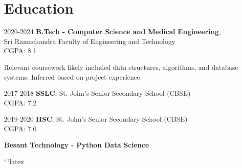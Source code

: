 \section{Education}
\begin{twocolentry}{2020-2024}
        \textbf{B.Tech - Computer Science and Medical Engineering}, \\
        Sri Ramachandra Faculty of Engineering and Technology\\
        CGPA: 8.1
\end{twocolentry}
\vspace{0.10 cm}
\begin{onecolentry}
        \begin{highlights}
            \item Relevant coursework likely included data structures,
                  algorithms, and database systems.  Inferred based on
                  project experience.
        \end{highlights}
\end{onecolentry}
\vspace{0.10 cm}
\begin{twocolentry}{2017-2018}
        \textbf{SSLC}, St. John’s Senior Secondary School (CBSE)\\
        CGPA: 7.2
\end{twocolentry}
\vspace{0.10 cm}
\begin{twocolentry}{2019-2020}
        \textbf{HSC}, St. John’s Senior Secondary School (CBSE)\\
        CGPA: 7.6
\end{twocolentry}
\vspace{0.10 cm}
\begin{onecolentry}
        \textbf{Besant Technology - Python Data Science}
\end{onecolentry}


```latex

